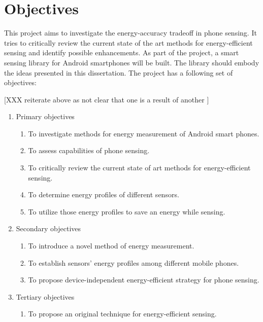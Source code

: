 \section{Objectives}
\label{s:objectives}
\hspace{10pt} This project aims to investigate the energy-accuracy tradeoff in phone sensing. It tries to critically review the current state of the art methods for energy-efficient sensing and identify possible enhancements. As part of the project, a smart sensing library for Android smartphones will be built. The library should embody the ideas presented in this dissertation. The project has a following set of objectives:
 
[XXX reiterate above as not clear that one is a result of another ]\\


\begin{enumerate}
 \item Primary objectives
  \begin{enumerate}
  	\item To investigate methods for energy measurement of Android smart phones.
  	\item To assess capabilities of phone sensing.
  	\item To critically review the current state of art methods for energy-efficient sensing.
  	\item To determine energy profiles of different sensors.
  	\item To utilize those energy profiles to save an energy while sensing.
  \end{enumerate}
  \item Secondary objectives
  \begin{enumerate}
    \item To introduce a novel method of energy measurement.
  	\item To establish sensors' energy profiles among different mobile phones.
  	\item To propose device-independent energy-efficient strategy for phone sensing.
  \end{enumerate}
  \item Tertiary objectives
  \begin{enumerate}
   \item To propose an original technique for energy-efficient sensing.
  \end{enumerate}
\end{enumerate}